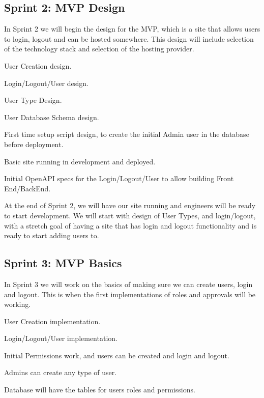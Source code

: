 \subsection {Sprint 2: MVP Design}
In Sprint 2 we will begin the design for the MVP, which is a site that allows users to login, logout and can be hosted somewhere.
This design will include selection of the technology stack and selection of the hosting provider.
	\begin{todolist}[leftmargin=3\parindent]
		\item User Creation design.
		\item Login/Logout/User design.
		\item User Type Design.
		\item User Database Schema design.
		\item First time setup script design, to create the initial Admin user in the database before deployment.
		\item Basic site running in development and deployed.
		\item Initial OpenAPI specs for the Login/Logout/User to allow building Front End/BackEnd.
	\end{todolist}

At the end of Sprint 2, we will have our site running and engineers will be ready to start development.
We will start with design of User Types, and login/logout, with a stretch goal of having a site that has login and logout functionality and is ready to start adding users to.


\subsection {Sprint 3: MVP Basics}
In Sprint 3 we will work on the basics of making sure we can create users, login and logout.
This is when the first implementations of roles and approvals will be working.

	\begin{todolist}[leftmargin=3\parindent]
		\item User Creation implementation.
		\item Login/Logout/User implementation.
		\item Initial Permissions work, and users can be created and login and logout.
		\item Admins can create any type of user.
		\item Database will have the tables for users roles and permissions.
	\end{todolist}


